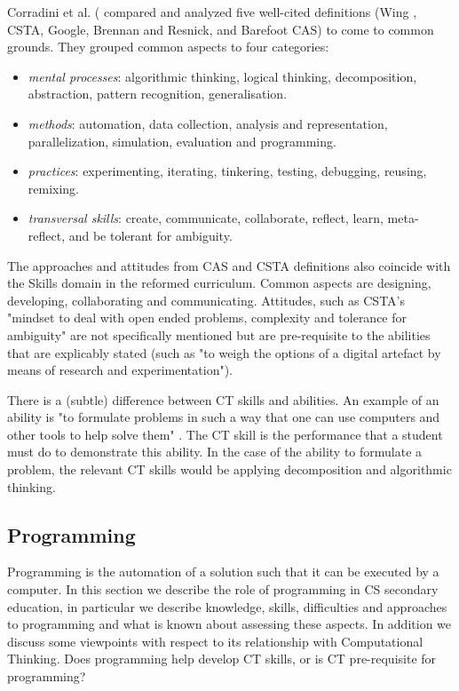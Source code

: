 Corradini et al. (\cite{corradini2017conceptions} compared and analyzed five well-cited definitions (Wing \cite{Wing2006}, CSTA\cite{CSTA2011CT}, Google\cite{Google2017CT}, Brennan and Resnick\cite{BrennanResnick2012}, and Barefoot CAS\cite{CAS2014CT}) to come to common grounds. They grouped common aspects to four categories:
\begin{itemize}
\item \emph{mental processes}: algorithmic thinking, logical thinking, decomposition, abstraction, pattern recognition, generalisation.
\item \emph{methods}: automation, data collection, analysis and representation, parallelization, simulation, evaluation and programming.
\item \emph{practices}: experimenting, iterating, tinkering, testing, debugging, reusing, remixing.
\item \emph{transversal skills}: create, communicate, collaborate, reflect, learn, meta-reflect, and be tolerant for ambiguity.
\end{itemize}

The approaches and attitudes from CAS and CSTA definitions also coincide with the Skills domain in the reformed curriculum. Common aspects are designing, developing, collaborating and communicating. Attitudes, such as CSTA's "mindset to deal with open ended problems, complexity and tolerance for ambiguity" are not specifically mentioned but are pre-requisite to the abilities that are explicably stated (such as "to weigh the options of a digital artefact by means of research and experimentation").



There is a (subtle) difference between CT skills and abilities. An example of an ability is "to formulate problems in such a way that one can use computers and other tools to help solve them" \cite{Barendsen2016}. The CT skill is the performance that a student must do to demonstrate this ability. In the case of the ability to formulate a problem, the relevant CT skills would be applying decomposition and algorithmic thinking.

\subsection{Programming}
Programming is the automation of a solution such that it can be executed by a computer. In this section we describe the role of programming in CS secondary education, in particular we describe knowledge, skills, difficulties and approaches to programming and what is known about assessing these aspects. In addition we discuss some viewpoints with respect to its relationship with Computational Thinking. Does programming help develop CT skills, or is CT pre-requisite for programming?



